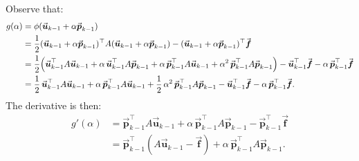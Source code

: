 \documentclass[10pt,oneside,openany]{memoir}
\begin{document}
    \begin{solution}
        Observe that:
            \begin{equation*}
            \begin{split}
                g(\alpha)
                &= \phi(\vec{\boldsymbol{u}}_{k-1}+\alpha\vec{\boldsymbol{p}}_{k-1}) \\
                &= \frac12(\vec{\boldsymbol{u}}_{k-1}+\alpha\vec{\boldsymbol{p}}_{k-1})^{\top}
                A(\vec{\boldsymbol{u}}_{k-1}+\alpha\vec{\boldsymbol{p}}_{k-1})
                -(\vec{\boldsymbol{u}}_{k-1}+\alpha\vec{\boldsymbol{p}}_{k-1})^{\top}\vec{\boldsymbol{f}} \\
                &= \frac12\Bigl(\vec{\boldsymbol{u}}_{k-1}^{\top}A\vec{\boldsymbol{u}}_{k-1}
                +\alpha\,\vec{\boldsymbol{u}}_{k-1}^{\top}A\vec{\boldsymbol{p}}_{k-1}
                +\alpha\,\vec{\boldsymbol{p}}_{k-1}^{\top}A\vec{\boldsymbol{u}}_{k-1}
                +\alpha^2\,\vec{\boldsymbol{p}}_{k-1}^{\top}A\vec{\boldsymbol{p}}_{k-1}\Bigr)
                -\vec{\boldsymbol{u}}_{k-1}^{\top}\vec{\boldsymbol{f}}
                -\alpha\,\vec{\boldsymbol{p}}_{k-1}^{\top}\vec{\boldsymbol{f}} \\
                &= \frac12\,\vec{\boldsymbol{u}}_{k-1}^{\top}A\vec{\boldsymbol{u}}_{k-1}
                + \alpha\,\vec{\boldsymbol{p}}_{k-1}^{\top}A\vec{\boldsymbol{u}}_{k-1}
                + \frac12\,\alpha^2\,\vec{\boldsymbol{p}}_{k-1}^{\top}A\vec{\boldsymbol{p}}_{k-1}
                -\vec{\boldsymbol{u}}_{k-1}^{\top}\vec{\boldsymbol{f}}
                -\alpha\,\vec{\boldsymbol{p}}_{k-1}^{\top}\vec{\boldsymbol{f}}.
            \end{split}
            \end{equation*}
        The derivative is then:
            \begin{equation*}
            \begin{split}
                g'(\alpha)
                &= \vec{\boldsymbol{p}}_{k-1}^{\top}A\vec{\boldsymbol{u}}_{k-1}
                + \alpha\,\vec{\boldsymbol{p}}_{k-1}^{\top}A\vec{\boldsymbol{p}}_{k-1}
                -\vec{\boldsymbol{p}}_{k-1}^{\top}\vec{\boldsymbol{f}} \\
                &= \vec{\boldsymbol{p}}_{k-1}^{\top}(A\vec{\boldsymbol{u}}_{k-1}-\vec{\boldsymbol{f}})
                + \alpha\,\vec{\boldsymbol{p}}_{k-1}^{\top}A\vec{\boldsymbol{p}}_{k-1}.
            \end{split}
            \end{equation*}

\end{solution}
\end{document}
